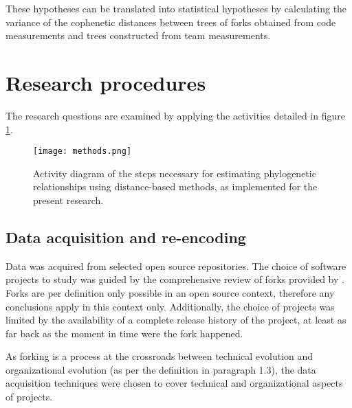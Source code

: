 \noindent
These hypotheses can be translated into statistical hypotheses by calculating the variance of the cophenetic distances between trees of forks obtained from code measurements and trees constructed from team measurements.



\section{Research procedures}
The research questions are examined by applying the activities detailed in figure \ref{fig:methods}.

\begin{figure}[H]
  \centering
  \texttt{[image: methods.png]}
  \caption{Activity diagram of the steps necessary for estimating phylogenetic relationships using distance-based methods, as implemented for the present research.}
  \label{fig:methods}
\end{figure}

\subsection{Data acquisition and re-encoding}
Data was acquired from selected open source repositories. The choice of software projects to study was guided by the comprehensive review of forks provided by \citet{Robles2012a}. Forks are per definition only possible in an open source context, therefore any conclusions apply in this context only. Additionally, the choice of projects was limited by the availability of a complete release history of the project, at least as far back as the moment in time were the fork happened.

As forking is a process at the crossroads between technical evolution and organizational evolution (as per the definition in paragraph 1.3), the data acquisition techniques were chosen to cover technical and organizational aspects of projects.

